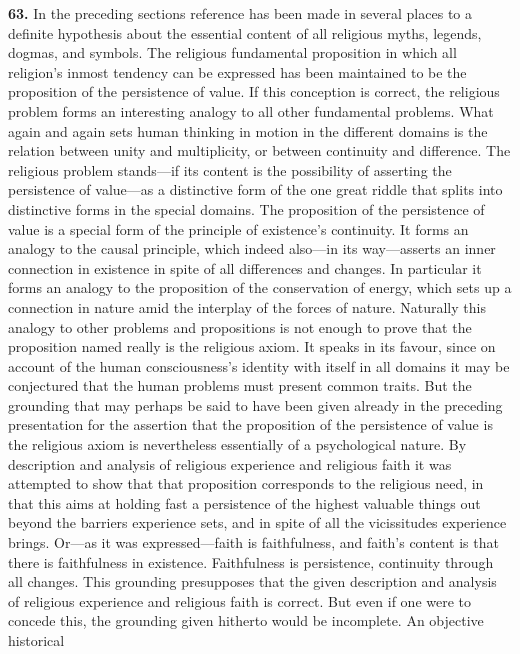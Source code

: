 \documentclass[12pt,a4paper]{book}
\newcommand{\opage}[1]{\marginnote{\footnotesize\textit{[#1]}}}
\begin{document}
\bigskip

\noindent\textbf{63.} In the preceding sections reference has been made in several places to a
definite hypothesis about the essential content of all religious myths, legends, dogmas, and
symbols. The religious fundamental proposition in which all religion's inmost tendency can be
expressed has been maintained to be the proposition of the persistence of value. If this
conception is correct, the religious problem forms an interesting analogy to all other
fundamental problems. What again and again sets human thinking in motion in the different domains
is the relation between unity and multiplicity, or between continuity and difference. The
religious problem stands---if its content is the possibility of asserting the persistence of
value---as a distinctive form of the one great riddle that splits into distinctive forms in the
special domains. The proposition of the persistence of value is a special form of the principle of
existence's continuity. It forms an analogy to the causal principle, which indeed also---in its
way---asserts an inner connection in existence in spite of all differences and changes. In
particular it forms an analogy to the proposition of the conservation of energy, which sets up a
connection in nature amid the interplay of the forces of nature. Naturally this analogy to other
problems and propositions is not enough to prove that the proposition named really is the religious
axiom. It speaks in its favour, since on account of the human consciousness's identity with itself
in all domains it may be conjectured that the human problems must present common traits. But the
grounding that may perhaps be said to have been given already in the preceding presentation for the
assertion that the proposition of the persistence of value is the religious axiom is nevertheless
essentially of a 
\opage{146}psychological nature. By description and analysis of religious experience and
religious faith it was attempted to show that that proposition corresponds to the religious need,
in that this aims at holding fast a persistence of the highest valuable things out beyond the
barriers experience sets, and in spite of all the vicissitudes experience brings. Or---as it was
expressed---faith is faithfulness, and faith's content is that there is faithfulness in existence.
Faithfulness is persistence, continuity through all changes. This grounding presupposes that the
given description and analysis of religious experience and religious faith is correct. But even if
one were to concede this, the grounding given hitherto would be incomplete. An objective historical
\end{document}
